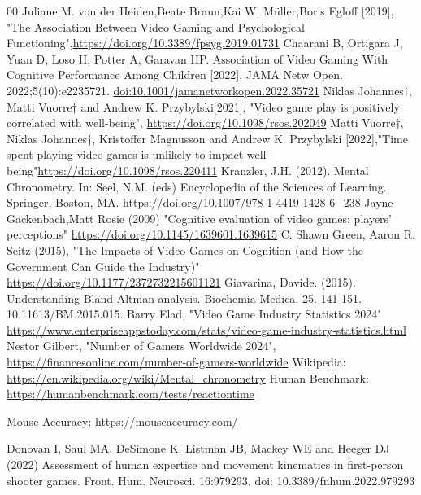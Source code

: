 \documentclass[conference]{IEEEtran}
\begin{document}
\begin{thebibliography}{00}
Juliane M. von der Heiden,Beate Braun,Kai W. Müller,Boris Egloff [2019], "The Association Between Video Gaming and Psychological Functioning",\href{https://doi.org/10.3389/fpsyg.2019.01731}{https://doi.org/10.3389/fpsyg.2019.01731}
 Chaarani B, Ortigara J, Yuan D, Loso H, Potter A, Garavan HP. Association of Video Gaming With Cognitive Performance Among Children [2022]. JAMA Netw Open. 2022;5(10):e2235721. \href{doi:10.1001/jamanetworkopen.2022.35721}{doi:10.1001/jamanetworkopen.2022.35721}
Niklas Johannes†, Matti Vuorre† and Andrew K. Przybylski[2021], "Video game play is positively correlated with well-being", \href{https://doi.org/10.1098/rsos.202049}{https://doi.org/10.1098/rsos.202049}
 Matti Vuorre†, Niklas Johannes†, Kristoffer Magnusson and Andrew K. Przybylski [2022],"Time spent playing video games is unlikely to impact well-being"\href{https://doi.org/10.1098/rsos.220411}{https://doi.org/10.1098/rsos.220411}
 Kranzler, J.H. (2012). Mental Chronometry. In: Seel, N.M. (eds) Encyclopedia of the Sciences of Learning. Springer, Boston, MA. \href{https://doi.org/10.1007/978-1-4419-1428-6_238}{https://doi.org/10.1007/978-1-4419-1428-6_238}
Jayne Gackenbach,Matt Rosie (2009) "Cognitive evaluation of video games: players' perceptions" \href{https://doi.org/10.1145/1639601.1639615}{https://doi.org/10.1145/1639601.1639615}
C. Shawn Green, Aaron R. Seitz (2015), "The Impacts of Video Games on Cognition (and How the Government Can Guide the Industry)" \href{https://doi.org/10.1177/2372732215601121}{https://doi.org/10.1177/2372732215601121}
 Giavarina, Davide. (2015). Understanding Bland Altman analysis. Biochemia Medica. 25. 141-151. 10.11613/BM.2015.015.
 Barry Elad, "Video Game Industry Statistics 2024" \href{https://www.enterpriseappstoday.com/stats/video-game-industry-statistics.html}{https://www.enterpriseappstoday.com/stats/video-game-industry-statistics.html}
Nestor Gilbert, "Number of Gamers Worldwide 2024", \href{https://financesonline.com/number-of-gamers-worldwide}{https://financesonline.com/number-of-gamers-worldwide} 
Wikipedia: \href{https://en.wikipedia.org/wiki/Mental_chronometry#Standard_reaction_time_paradigms}{https://en.wikipedia.org/wiki/Mental_chronometry}
Human Benchmark:
\href{https://humanbenchmark.com/tests/reactiontime}{https://humanbenchmark.com/tests/reactiontime}

Mouse Accuracy: \href{https://mouseaccuracy.com/}{https://mouseaccuracy.com/}

 Donovan I, Saul MA, DeSimone K, Listman JB, Mackey WE and Heeger DJ (2022) Assessment of human expertise and movement kinematics in first-person shooter games. Front. Hum. Neurosci. 16:979293. doi: 10.3389/fnhum.2022.979293

\end{thebibliography}
\end{document}
